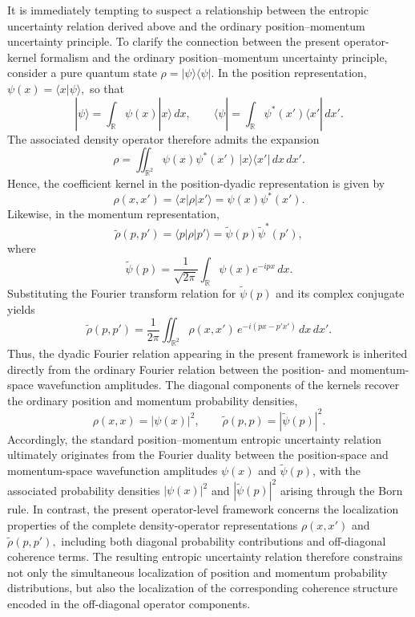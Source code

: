 \documentclass[aps,pra,onecolumn,nofootinbib,superscriptaddress,showpacs]{revtex4}
\begin{document}
\noindent It is immediately tempting to suspect a relationship between the
entropic uncertainty relation derived above and the ordinary
position--momentum uncertainty principle. To clarify the connection between the present operator-kernel
formalism and the ordinary position--momentum uncertainty principle,
consider a pure quantum state
$\rho = |\psi\rangle\langle\psi|.
$
In the position representation,
$
\psi(x)=\langle x|\psi\rangle,
$
so that
\begin{equation}
|\psi\rangle
=
\int_{\mathbb R}\psi(x)|x\rangle\,dx,
\qquad
\langle\psi|
=
\int_{\mathbb R}\psi^*(x')\langle x'|\,dx'.
\end{equation}
The associated density operator therefore admits the expansion
\begin{equation}
\rho
=
\iint_{\mathbb R^2}
\psi(x)\psi^*(x')
\,|x\rangle\langle x'|
\,dx\,dx'.
\end{equation}
Hence, the coefficient kernel in the position-dyadic representation is
given by
\begin{equation}
\rho(x,x')
=
\langle x|\rho|x'\rangle
=
\psi(x)\psi^*(x').
\end{equation}
Likewise, in the momentum representation,
\begin{equation}
\widetilde{\rho}(p,p')
=
\langle p|\rho|p'\rangle
=
\widetilde{\psi}(p)\widetilde{\psi}^{*}(p'),
\end{equation}
where
\begin{equation}
\widetilde{\psi}(p)
=
\frac{1}{\sqrt{2\pi}}
\int_{\mathbb R}
\psi(x)e^{-ipx}\,dx.
\end{equation}
Substituting the Fourier transform relation for
$\widetilde{\psi}(p)$ and its complex conjugate yields
\begin{equation}
\widetilde{\rho}(p,p')
=
\frac{1}{2\pi}
\iint_{\mathbb R^2}
\rho(x,x')
\,e^{-i(px-p'x')}
\,dx\,dx'.
\end{equation}
Thus, the dyadic Fourier relation appearing in the
present framework is inherited directly from the
ordinary Fourier relation between the position- and
momentum-space wavefunction amplitudes.
The diagonal components of the kernels recover the ordinary position
and momentum probability densities,
\begin{equation}
\rho(x,x)
=
|\psi(x)|^2,
\qquad
\widetilde{\rho}(p,p)
=
|\widetilde{\psi}(p)|^2.
\end{equation}
Accordingly, the standard position--momentum entropic uncertainty
relation ultimately originates from the Fourier duality between the
position-space and momentum-space wavefunction amplitudes
$\psi(x)$ and $\widetilde{\psi}(p)$, with the associated probability
densities $|\psi(x)|^2$ and $|\widetilde{\psi}(p)|^2$ arising through
the Born rule. In contrast, the present operator-level framework concerns
the localization properties of the complete density-operator
representations
$
\rho(x,x')$ and
$\widetilde{\rho}(p,p'),
$
including both diagonal probability contributions and
off-diagonal coherence terms. The resulting entropic uncertainty relation therefore constrains not
only the simultaneous localization of position and momentum
probability distributions, but also the localization of the
corresponding coherence structure encoded in the off-diagonal operator
components.
\end{document}
